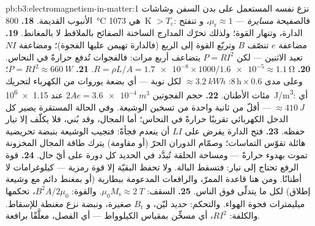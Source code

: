 \begin{solution}{pb:b3:electromagnetism-in-matter:1}
نزع  نفسه المستعمل على بدن السفن وشاشات الأنبوب القديمة.
\textbf{18.} \qty{800}{\celsius} هي \qty{1073}{K} $> T_{\text{c}}$:
فالصفيحة \emph{مسايرة} --- $\mu_{\text{r}} \approx 1$، و
تنفتح الدارة، وتنهار القوة؛ ولذلك تحرّك المدارج الساخنة الصفائح
بالملاقط لا بالمغانط.
\textbf{19.} مضاعفة $e$ تنصّف $B$ وتربّع القوة إلى الربع
(فالدارة تهيمن عليها الفجوة)؛ ومضاعفة $NI$ تعيد الاثنين --- لكن
$P = RI^2$ يتضاعف أربع مرات: فالفجوات تُدفع حرارةً في النحاس.
\textbf{20.} $R = \rho L/A = \num{1.7e-8}\times1000/
\num{1.6e-5} \approx \qty{1.1}{\ohm}$.
\textbf{21.} $P = RI^2 \approx \qty{660}{W}$؛ وعلى مدى
$8\,\text{h}\times0.6$: $\approx\qty{3.2}{kWh}$ لكل نوبة ---
أي بضعة يوروات من الكهرباء لتحريك مئات الأطنان.
\textbf{22.} حجم الفجوتين $2Ae = \qty{3.6e-4}{m^3}$ عند
\qty{1.15e6}{J/m^3}: أي $\approx\qty{410}{J}$ --- أقلّ من
ثانية واحدة من تسخين الوشيعة. وفي الحالة المستقرة يصير كل الدخل
الكهربائي تقريبًا حرارةً في النحاس؛ أما المجال، وقد بُني، فلا يكلّف إلا
تيار حفظه.
\textbf{23.} فتح الدارة يفرض على $LI$ أن ينعدم فجأةً:
فتجيب الوشيعة بنبضة تحريضية هائلة تقوّس
التماسات؛ وصمّام الدوران الحرّ (أو مقاومة) يترك طاقة المجال
المخزونة تموت بهدوء حرارةً --- ومساحة الحلقة تُبدَّد
في الحديد كل دورة على أيّ حال.
\textbf{24.} قوة الرفع تحتاج إلى تيار: فتسقط البالة.
ولا تحفظ البقيّة إلا قوة رمزية --- كيلوغرامات لا أطنانًا.
ومن هنا قاعدة الممرّ، والرافعات المدعومة ببطارية (أو
بمغنط دائم مع وشيعة إطلاق) لكل ما يتدلّى فوق الناس.
\textbf{25.} السقف: $\mu_0M_{\text{s}} \approx \qty{2}{T}$.
والقوة: $B^2A/2\mu_0$، تحكمها ميليمترات فجوة الهواء. والتحكم:
حديد ليّن، و $B_{\text{r}}$ صغيرة، ونبضة نزع مغنطة للإسقاط. والكلفة:
$RI^2$، أي مسخِّن بمقياس الكيلوواط --- أي الفصل، معلَّقًا
برافعة.
\end{solution}
